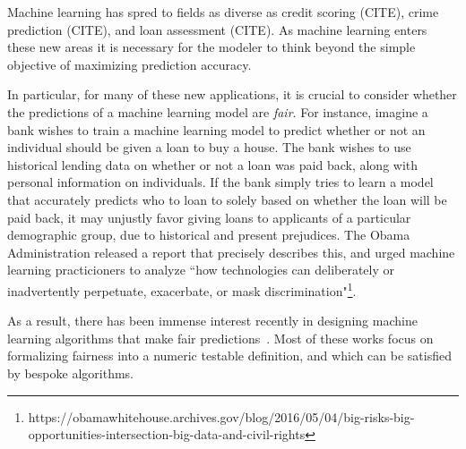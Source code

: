Machine learning has spred to fields as diverse as credit scoring (CITE), crime prediction (CITE), and loan assessment (CITE). As machine learning enters these new areas it is necessary for the modeler to think beyond the simple objective of maximizing prediction accuracy.

In particular, for many of these new applications, it is crucial to
consider whether the predictions of a machine learning model are
\emph{fair}. For instance, imagine a bank wishes to train a machine
learning model to predict whether or not an individual should be given
a loan to buy a house. The bank wishes to use historical lending data
on whether or not a loan was paid back, along with personal
information on individuals. If the bank simply tries to learn a model
that accurately predicts who to loan to solely based on whether the
loan will be paid back, it may unjustly favor giving loans to
applicants of a particular demographic group, due to historical and
present prejudices. The Obama Administration released a report that
precisely describes this, and urged machine learning practicioners to
analyze ``how technologies can deliberately or inadvertently
perpetuate, exacerbate, or mask
discrimination"\footnote{https://obamawhitehouse.archives.gov/blog/2016/05/04/big-risks-big-opportunities-intersection-big-data-and-civil-rights}.

As a result, there has been immense interest recently in designing
machine learning algorithms that make fair
predictions~\cite{hardt2016equality,dwork2012fairness,joseph2016rawlsian,kamishima2011fairness,zliobaite2015survey,zafar2016fairness,zafar2015learning,grgiccase,kleinberg2016inherent,calders2010three,kamiran2012data,bolukbasi2016man,kamiran2009classifying,zemel2013learning,louizos2015variational}. Most
of these works focus on formalizing fairness into a numeric testable
definition, and which can be satisfied by bespoke algorithms.


